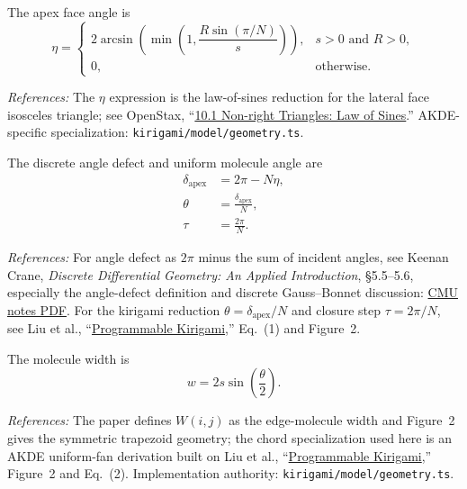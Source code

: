 \documentclass[11pt]{article}
\newcommand{\formularefs}[1]{%
\par\smallskip
\noindent\footnotesize\textit{References: }#1
\par\smallskip\normalsize
}
\begin{document}
The apex face angle is
\begin{equation}
\eta =
\begin{cases}
2\arcsin\!\left(\min\!\left(1,\dfrac{R\sin(\pi/N)}{s}\right)\right), & s>0 \text{ and } R>0,\\[6pt]
0, & \text{otherwise.}
\end{cases}
\end{equation}

\formularefs{The \(\eta\) expression is the law-of-sines reduction for the lateral face isosceles triangle; see OpenStax, ``\href{https://openstax.org/books/algebra-and-trigonometry-2e/pages/10-1-non-right-triangles-law-of-sines}{10.1 Non-right Triangles: Law of Sines}.'' AKDE-specific specialization: \texttt{kirigami/model/geometry.ts}.}

The discrete angle defect and uniform molecule angle are
\begin{align}
\delta_{\mathrm{apex}} &= 2\pi - N\eta, \\
\theta &= \frac{\delta_{\mathrm{apex}}}{N}, \\
\tau &= \frac{2\pi}{N}.
\end{align}

\formularefs{For angle defect as \(2\pi\) minus the sum of incident angles, see Keenan Crane, \emph{Discrete Differential Geometry: An Applied Introduction}, §5.5--5.6, especially the angle-defect definition and discrete Gauss--Bonnet discussion: \href{https://www.cs.cmu.edu/~kmcrane/Projects/DDG/paper.pdf}{CMU notes PDF}. For the kirigami reduction \(\theta=\delta_{\mathrm{apex}}/N\) and closure step \(\tau=2\pi/N\), see Liu et al., ``\href{https://static1.squarespace.com/static/5783b6f903596e5098f3fce8/t/5dd2e95aee053940522eab1a/1574103423054/DETC2019-97557.pdf}{Programmable Kirigami},'' Eq.~(1) and Figure~2.}

The molecule width is
\begin{equation}
w = 2s\sin\!\left(\frac{\theta}{2}\right).
\end{equation}

\formularefs{The paper defines \(W(i,j)\) as the edge-molecule width and Figure~2 gives the symmetric trapezoid geometry; the chord specialization used here is an AKDE uniform-fan derivation built on Liu et al., ``\href{https://static1.squarespace.com/static/5783b6f903596e5098f3fce8/t/5dd2e95aee053940522eab1a/1574103423054/DETC2019-97557.pdf}{Programmable Kirigami},'' Figure~2 and Eq.~(2). Implementation authority: \texttt{kirigami/model/geometry.ts}.}
\end{document}
